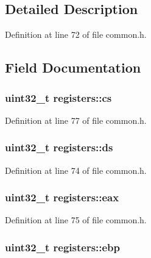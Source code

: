 \subsection{Detailed Description}


Definition at line 72 of file common.\+h.



\subsection{Field Documentation}
\subsubsection[{\texorpdfstring{cs}{cs}}]{\setlength{\rightskip}{0pt plus 5cm}uint32\+\_\+t registers\+::cs}\hypertarget{structregisters_a7d73555c87de229a90292640f544ab27}{}\label{structregisters_a7d73555c87de229a90292640f544ab27}


Definition at line 77 of file common.\+h.

\subsubsection[{\texorpdfstring{ds}{ds}}]{\setlength{\rightskip}{0pt plus 5cm}uint32\+\_\+t registers\+::ds}\hypertarget{structregisters_a806ec3ba0cf965d456601aea4c039ec3}{}\label{structregisters_a806ec3ba0cf965d456601aea4c039ec3}


Definition at line 74 of file common.\+h.

\subsubsection[{\texorpdfstring{eax}{eax}}]{\setlength{\rightskip}{0pt plus 5cm}uint32\+\_\+t registers\+::eax}\hypertarget{structregisters_a1e01e806248cd98e55e0b053db6a6a51}{}\label{structregisters_a1e01e806248cd98e55e0b053db6a6a51}


Definition at line 75 of file common.\+h.

\subsubsection[{\texorpdfstring{ebp}{ebp}}]{\setlength{\rightskip}{0pt plus 5cm}uint32\+\_\+t registers\+::ebp}\hypertarget{structregisters_a8d156d1d27fcb1c2f2bbcce1a784431f}{}\label{structregisters_a8d156d1d27fcb1c2f2bbcce1a784431f}


